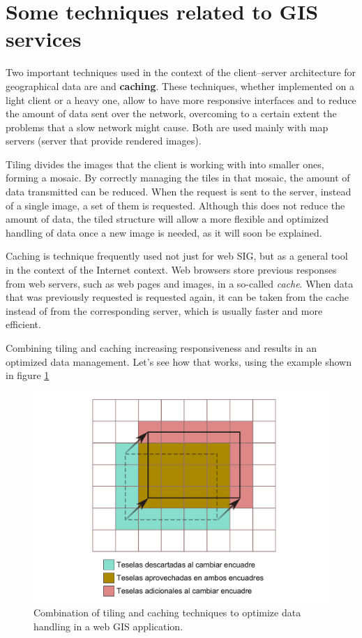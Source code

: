 \section{Some techniques related to GIS services}

Two important techniques used in the context of the client--server architecture for geographical data are  and \textbf{caching}. These techniques, whether implemented on a light client or a heavy one, allow to have more responsive interfaces and to reduce the amount of data sent over the network, overcoming to a certain extent the problems that a slow network might cause. Both are used mainly with map servers (server that provide rendered images).

Tiling divides the images that the client is working with into smaller ones, forming a mosaic. By correctly managing the tiles in that mosaic, the amount of data transmitted can be reduced. When the request is sent to the server, instead of a single image, a set of them is requested. Although this does not reduce the amount of data, the tiled structure will allow a more flexible and optimized handling of data once a new image is needed, as it will soon be explained.

Caching is technique frequently used not just for web SIG, but as a general tool in the context of the Internet context. Web browsers store previous responses from web servers, such as web pages and images, in a so-called \emph{cache}. When data that was previously requested is requested again, it can be taken from the cache instead of from the corresponding server, which is usually faster and more efficient.

Combining tiling and caching increasing responsiveness and results in an optimized data management. Let's see how that works, using the example shown in figure \ref{Fig:Tiling} 

\begin{figure}[!hbt]   
\centering
\includegraphics[width=\textwidth]{Software/Tiling.pdf}
\caption{\small Combination of tiling and caching techniques to optimize data handling in a web GIS application.}
\label{Fig:Tiling} 
\end{figure}

